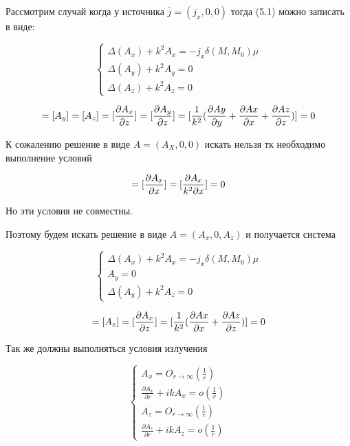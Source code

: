 	Рассмотрим случай когда у источника $\bar{j} = (j_x, 0, 0)$ тогда (5.1) можно записать в виде:
	
	\begin{equation}
		\begin{cases}\Delta(A_x) + k^2 A_x = -j_x \delta(M, M_0) \mu \\ \Delta(A_y) + k^2 A_y = 0  \\ \Delta(A_z) + k^2 A_z = 0\end{cases}
	\end{equation}
	
	\begin{equation}
		[A_x] = [A_y] = [A_z] = [\frac{\partial A_x}{\partial z}] = [\frac{\partial A_y}{\partial z}] = [\frac{1}{k^2}(\frac{\partial Ay}{\partial y} + \frac{\partial Ax}{\partial x} + \frac{\partial Az}{\partial z})] = 0 \\ 
	\end{equation}

	К сожалению решение в виде $A = (A_X, 0, 0)  $ искать нельзя тк необходимо выполнение условий
	
	\begin{equation}
		[A_x] = [\frac{\partial A_x}{\partial x}] = [\frac{\partial A_x}{k^2 \partial x}] = 0 \\ 
	\end{equation}
	
	Но эти условия не совместны.
	
	Поэтому будем искать решение в виде $A = (A_x, 0, A_z)$ и получается система
	
	\begin{equation}
		\begin{cases}\Delta(A_x) + k^2 A_x = -j_x \delta(M, M_0) \mu \\  A_y = 0  \\ \Delta(A_y) + k^2 A_z = 0\end{cases}
	\end{equation}
	
	\begin{equation}
		[A_x] = [A_z] = [\frac{\partial A_x}{\partial z}] = [\frac{1}{k^2}( \frac{\partial Ax}{\partial x} + \frac{\partial Az}{\partial z})] = 0 \\ 
	\end{equation}
	
	Так же должны выполняться условия излучения
	
	\begin{equation*}
		\begin{cases}
			A_x = O_{r \rightarrow \infty} (\frac{1}{r}) \\ 
			\frac{\partial A_x}{\partial r} + i k A_x = o(\frac{1}{r})\\
			A_z = O_{r \rightarrow \infty} (\frac{1}{r}) \\ 
			\frac{\partial A_z}{\partial r} + i k A_z = o(\frac{1}{r})
		\end{cases}
	\end{equation*}
	
